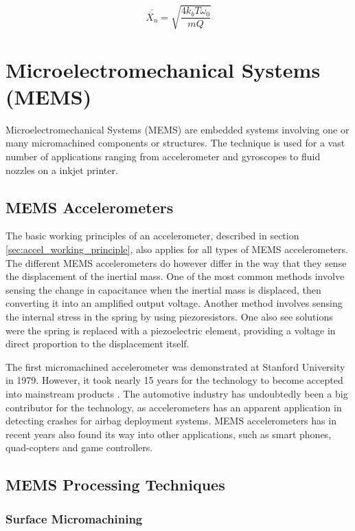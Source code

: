 \begin{equation}
\bar{\ddot{X_n}} = \sqrt{\frac{4 k_b T \omega_0}{mQ}}
\label{eq:noise_spectral_density}
\end{equation}

\section{Microelectromechanical Systems (MEMS)}

Microelectromechanical Systems (MEMS) are embedded systems involving one or many micromachined components or structures\cite[p.~3]{maluf04}. The technique is used for a vast number of applications ranging from accelerometer and gyroscopes to fluid nozzles on a inkjet printer.

\subsection{MEMS Accelerometers}

The basic working principles of an accelerometer, described in section \ref{sec:accel_working_principle}, also applies for all types of MEMS accelerometers. The different MEMS accelerometers do however differ in the way that they sense the displacement of the inertial mass. One of the most common methods involve sensing the change in capacitance when the inertial mass is displaced, then converting it into an amplified output voltage. Another method involves sensing the internal stress in the spring by using piezoresistors. One also see solutions were the spring is replaced with a piezoelectric element, providing a voltage in direct proportion to the displacement itself.

The first micromachined accelerometer was demonstrated at Stanford University in 1979. However, it took nearly 15 years for the technology to become accepted into mainstream products \cite[p.~8]{maluf04}. The automotive industry has undoubtedly been a big contributor for the technology, as accelerometers has an apparent application in detecting crashes for airbag deployment systems. MEMS accelerometers has in recent years also found its way into other applications, such as smart phones, quad-copters and game controllers. 

\subsection{MEMS Processing Techniques}

\subsubsection{Surface Micromachining}

